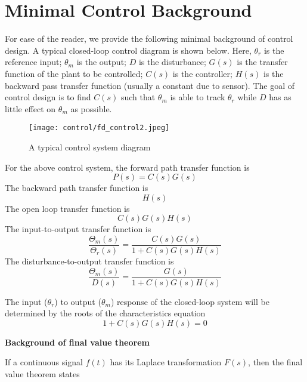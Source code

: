 \documentclass[10pt]{article}
\begin{document}


\section{Minimal Control Background}

For ease of the reader, we provide the following minimal background of control design. A typical closed-loop control diagram is shown below. Here, $\theta_r$ is the reference input; $\theta_m$ is the output; $D$ is the disturbance; $G(s)$ is the transfer function of the plant to be controlled; $C(s)$ is the controller; $H(s)$ is the backward pass transfer function (usually a constant due to sensor). The goal of control design is to find $C(s)$ such that $\theta_m$ is able to track $\theta_r$ while $D$ has as little effect on $\theta_m$ as possible.

    \begin{figure}[H]
    \centering
    \texttt{[image: control/fd\_control2.jpeg]}
    \caption{A typical control system diagram}
    \label{fig:1}
\end{figure}


For the above control system, the forward path transfer function is $$
P(s)=C(s)G(s)
$$
The backward path transfer function is 
$$
H(s)
$$
The open loop transfer function is
$$
C(s)G(s)H(s)
$$
The input-to-output transfer function is 
$$
\frac{\Theta_m(s)}{\Theta_r(s)}=\frac{C(s)G(s)}{1+C(s)G(s)H(s)}
$$
The disturbance-to-output transfer function is 
$$
\frac{\Theta_m(s)}{D(s)}=\frac{G(s)}{1+C(s)G(s)H(s)}
$$

The input ($\theta_r$) to output ($\theta_m$) response of the closed-loop system will be determined by the roots of the characteristics equation
$$
1+C(s)G(s)H(s)=0
$$












\textbf{Background of final value theorem}

If a continuous signal $f(t)$ has its Laplace transformation $F(s)$, then the final value theorem states 
\end{document}
